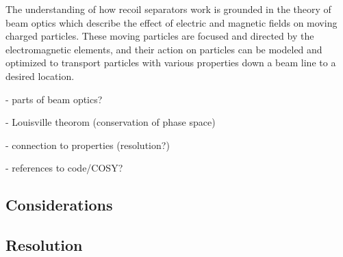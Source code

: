 The understanding of how recoil separators work is grounded in the theory of
beam optics which describe the effect of electric and magnetic fields on moving
charged particles. These moving particles are focused and directed by the
electromagnetic elements, and their action on particles can be modeled and
optimized to transport particles with various properties down a beam line to a
desired location.

- parts of beam optics?

- Louisville theorom (conservation of phase space)

- connection to properties (resolution?)

- references to code/COSY?

\subsection{Considerations}
\subsection{Resolution}
